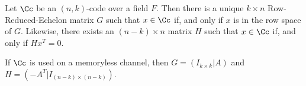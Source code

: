 \begin{theorem}\label{2.1.4}
    Let $\Cc$ be an  $(n,k)$-code over a field $F$. Then there is a unique
    $k \times n$ Row-Reduced-Echelon matrix $G$ such that  $x \in \Cc$ if, and
    only if $x$ is in the row space of $G$. Likewise, there exists an $(n-k)
    \times n$ matrix $H$ such that  $x \in \Cc$ if, and only if $Hx^T=0$.
\end{theorem}
\begin{corollary}
    If $\Cc$ is used on a memoryless channel, then  $G=(I_{k \times k}|A)$ and
    $H=(-A^T|I_{(n-k) \times (n-k)})$.
\end{corollary}
